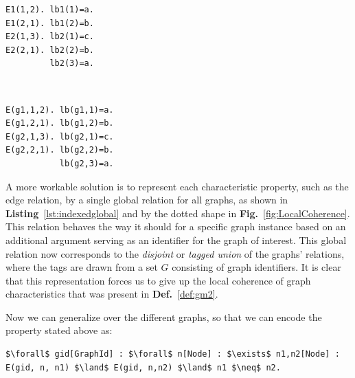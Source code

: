 \begin{minipage}[t]{0.45\linewidth}
\begin{lstlisting}[mathescape,caption=Multiple individual global relations,label=lst:multiglobal]
E1(1,2). lb1(1)=a.
E1(2,1). lb1(2)=b.
E2(1,3). lb2(1)=c.
E2(2,1). lb2(2)=b.
         lb2(3)=a.
\end{lstlisting}
\end{minipage}
\begin{minipage}[t]{0.1\linewidth}
 ~
\end{minipage}
\begin{minipage}[t]{0.45\linewidth}
\begin{lstlisting}[mathescape,caption=Disjoint union using indexed global relations,label=lst:indexedglobal]
E(g1,1,2). lb(g1,1)=a.
E(g1,2,1). lb(g1,2)=b.
E(g2,1,3). lb(g2,1)=c.
E(g2,2,1). lb(g2,2)=b.
           lb(g2,3)=a.
\end{lstlisting}
\end{minipage}




A more workable solution is to represent each characteristic property, such as the edge relation, by a single global relation for all graphs, as shown in \textbf{Listing}~\ref{lst:indexedglobal} and by the dotted shape in \textbf{Fig.}~\ref{fig:LocalCoherence}.
This relation behaves the way it should for a specific graph instance based on an additional argument serving as an identifier for the graph of interest.
This global relation now corresponds to the \emph{disjoint} or \emph{tagged union} of the graphs' relations, where the tags are drawn from a set $G$ consisting of graph identifiers.
It is clear that this representation forces us to give up the local coherence of graph characteristics that was present in \textbf{Def.}~\ref{def:gm2}.

Now we can generalize over the different graphs, so that we can encode the property stated above as:
\begin{center}
\begin{minipage}{0.95\linewidth}
\begin{lstlisting}[mathescape]
$\forall$ gid[GraphId] : $\forall$ n[Node] : $\exists$ n1,n2[Node] : E(gid, n, n1) $\land$ E(gid, n,n2) $\land$ n1 $\neq$ n2.
\end{lstlisting}
\end{minipage}
\end{center}

